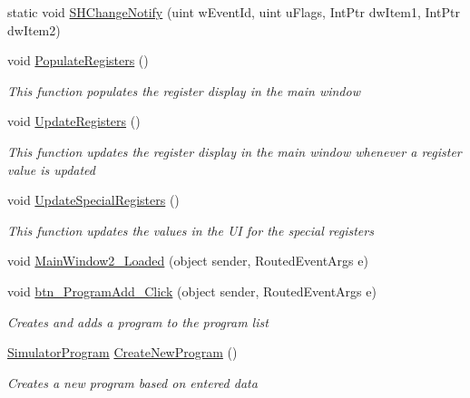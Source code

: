 \begin{DoxyCompactItemize}
\item 
static void \hyperlink{class_c_p_u___o_s___simulator_1_1_main_window_a0bbdb2d3b0e818f2d264770168521059}{S\+H\+Change\+Notify} (uint w\+Event\+Id, uint u\+Flags, Int\+Ptr dw\+Item1, Int\+Ptr dw\+Item2)
\item 
void \hyperlink{class_c_p_u___o_s___simulator_1_1_main_window_a06b2ba04e8c006037cae7b0e40b9c5a0}{Populate\+Registers} ()
\begin{DoxyCompactList}\small\item\em This function populates the register display in the main window \end{DoxyCompactList}\item 
void \hyperlink{class_c_p_u___o_s___simulator_1_1_main_window_a4fbca2d50698a847da4ab82c3f380680}{Update\+Registers} ()
\begin{DoxyCompactList}\small\item\em This function updates the register display in the main window whenever a register value is updated \end{DoxyCompactList}\item 
void \hyperlink{class_c_p_u___o_s___simulator_1_1_main_window_a798838ad3fae6117c8e624047a591931}{Update\+Special\+Registers} ()
\begin{DoxyCompactList}\small\item\em This function updates the values in the U\+I for the special registers \end{DoxyCompactList}\item 
void \hyperlink{class_c_p_u___o_s___simulator_1_1_main_window_a3b945b691332686989cd5b5107f7f98b}{Main\+Window2\+\_\+\+Loaded} (object sender, Routed\+Event\+Args e)
\item 
void \hyperlink{class_c_p_u___o_s___simulator_1_1_main_window_abe3e79941789134ce080390fcafc720e}{btn\+\_\+\+Program\+Add\+\_\+\+Click} (object sender, Routed\+Event\+Args e)
\begin{DoxyCompactList}\small\item\em Creates and adds a program to the program list \end{DoxyCompactList}\item 
\hyperlink{class_c_p_u___o_s___simulator_1_1_c_p_u_1_1_simulator_program}{Simulator\+Program} \hyperlink{class_c_p_u___o_s___simulator_1_1_main_window_a4cb75cfa224757b1dc708b60681ad803}{Create\+New\+Program} ()
\begin{DoxyCompactList}\small\item\em Creates a new program based on entered data \end{DoxyCompactList}\item 

\end{DoxyCompactItemize}
